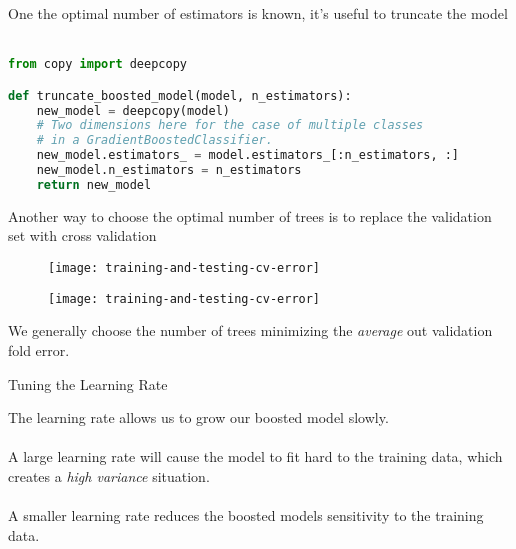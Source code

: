 %
\begin{frame}[fragile]
One the optimal number of estimators is known, it's useful to truncate the model\\~\\

\begin{lstlisting}[language=python]
from copy import deepcopy

def truncate_boosted_model(model, n_estimators):
    new_model = deepcopy(model)
    # Two dimensions here for the case of multiple classes
    # in a GradientBoostedClassifier.
    new_model.estimators_ = model.estimators_[:n_estimators, :]
    new_model.n_estimators = n_estimators
    return new_model
\end{lstlisting}

\end{frame}
%
\begin{frame}
Another way to choose the optimal number of trees is to replace the validation set with cross validation

  \begin{figure}
    \texttt{[image: training-and-testing-cv-error]}
  \end{figure}
  
\end{frame}
%
\begin{frame}

  \begin{figure}
    \texttt{[image: training-and-testing-cv-error]}
  \end{figure}
  
We generally choose the number of trees minimizing the \textit{average} out validation fold error.

\end{frame}
%
\begin{frame}{Tuning the Learning Rate}

The learning rate allows us to grow our boosted model slowly.\\~\\

A large learning rate will cause the model to fit hard to the training data, which creates a \textit{high variance} situation.\\~\\

A smaller learning rate reduces the boosted models sensitivity to the training data.\\~\\

\end{frame}
